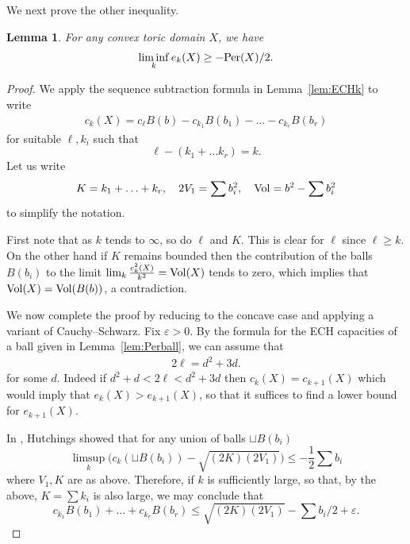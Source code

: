 \documentclass[11pt, reqno]{amsart}
\newtheorem{lemma}[thm]{Lemma}
\theoremstyle{remark}
\numberwithin{equation}{subsection}
\numberwithin{figure}{section}
\theoremstyle{customremark}
\newcommand{\Vol}{{\rm Vol}}
\newcommand{\Per}{{\rm Per}}
\newcommand{\eps}{\varepsilon}
\begin{document}
 
We next prove the other inequality.

\begin{lemma} \label{lem:ECHge} For any convex toric domain $X$,
we have
\[\liminf_{k} e_k(X) \ge - \Per(X)/2.\]
\end{lemma}


\begin{proof}
We apply the sequence subtraction formula in Lemma~\ref{lem:ECHk}  to write
\begin{align}\label{eqn:ck}
 c_k(X) = c_\ell B(b) - c_{k_1}B(b_1) - \ldots - c_{k_r} B(b_r)
 \end{align}
for suitable $\ell, k_i$ such that 
\[ \ell - (k_1 + \ldots k_r) = k.\] 
Let us write 
\[ K = k_1 + \ldots + k_r, \quad 2V_1 = \sum b_i^2, \quad \Vol = b^2 - \sum b_i^2  \]
to simplify the notation.    

\vspace{2 mm}


First note that as $k$ tends to $\infty$, so do $\ell$ and $K$. This is clear for $\ell$ since $\ell\ge k $.  
On the other hand if $K$ remains bounded then the contribution of the balls $B(b_i)$ to the limit
$\lim_k \frac {c_k^2(X)}{k^2} = \Vol(X)$ tends to zero, which implies that $\Vol(X) = \Vol(B(b))$, a contradiction.

We now complete the proof by reducing to the concave case and applying a variant of Cauchy--Schwarz.
Fix $\eps> 0$.
By the formula for the ECH capacities of a ball given in Lemma~\ref{lem:Perball}, we can assume
 that 
 \begin{align}\label{eqn:elld}
  2 \ell = d^2 + 3d.
  \end{align} 
 for some $d$. Indeed if $d^2 + d <2 \ell < d^2 + 3d$ then $c_k(X) = c_{k+1}(X)$ which would imply that
$e_k(X) > e_{k+1}(X)$, so that it suffices to find a lower bound for  $e_{k+1}(X)$.
 
 
 In \cite[Lem.3.8]{Ruel}, Hutchings 
   showed  that for any union of balls $\sqcup B(b_i)$ 
 $$
 \limsup_k \bigl(c_k(\sqcup B(b_i)) -   \sqrt{(2K)(2V_1)}\bigr) \le - \frac 12 \sum b_i
 $$
 where $V_1,K$ are as above.  Therefore, if 
  $k$ is sufficiently large, so that, by the above,  $K = \sum k_i$ is also large, 
  we may conclude that   
\[  c_{k_1}B(b_1) + \ldots + c_{k_r} B(b_r) \le \sqrt{ (2 K ) (2V_1)} - \sum b_i/2 + \eps.\]


\end{proof}
\end{document}
